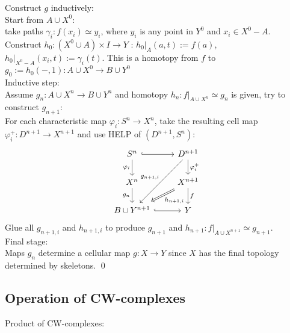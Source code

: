     \begin{prf}
        Construct $g$ inductively:\\
        Start from $A \cup X^0$:\\
        take paths $\gamma_i : f(x_i) \simeq y_i $, where $y_i$ is any point in $Y^0$ and $x_i \in X^0 - A$.\\
        Construct $h_0 : (X^0 \cup A) \times I \to Y $ : $h_0 |_{A} (a,t):= f(a)$,
        $h_0|_{X^0-A} (x_i,t) := \gamma_i(t)$.
        This is a homotopy from $f$ to $g_0 := h_0(-,1) : A\cup X^0 \to B \cup Y^0$\\
        Inductive step:\\
        Assume $g_n : A\cup X^n \to B \cup Y^n$ and homotopy $h_n : f|_{A \cup X^n} \simeq g_n$ is given, try to construct $g_{n+1}$:\\
        For each characteristic map $\varphi_i : S^n \to X^n$, take the resulting cell map $\varphi^+_i : D^{n+1} \to X^{n+1}$ 
        and use HELP of $(D^{n+1}, S^n)$:
        \[\begin{tikzcd}
            {S^n} & {D^{n+1}} \\
            {X^n} & {X^{n+1}} \\
            {B\cup Y^{n+1}} & Y
            \arrow[hook, from=1-1, to=1-2]
            \arrow["{\varphi_i}"', from=1-1, to=2-1]
            \arrow["{g_n}"', from=2-1, to=3-1]
            \arrow[hook, from=3-1, to=3-2]
            \arrow["{\varphi^+_i}", from=1-2, to=2-2]
            \arrow["f", from=2-2, to=3-2]
            \arrow["{g_{n+1,i}}"', from=1-2, to=3-1]
            \arrow["{h_{n+1,i}}", shorten <=4pt, shorten >=4pt, Rightarrow, from=2-2, to=3-1]
        \end{tikzcd}\]
        Glue all $g_{n+1,i}$ and $ h_{n+1,i}$ to produce $g_{n+1}$ and $h_{n+1} : f|_{A \cup X^{n+1}} \simeq g_{n+1}$.\\
        Final stage:\\
        Maps $g_n$ determine a cellular map $g : X \to Y$ since $X$ has the final topology determined by skeletons.
        \qed
    \end{prf}

    \subsection{Operation of CW-complexes}

    Product of CW-complexes:

